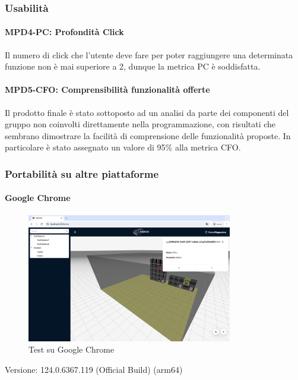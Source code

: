 \subsubsection{Usabilità}

\paragraph{MPD4-PC: Profondità Click}
Il numero di click che l'utente deve fare per poter raggiungere una determinata funzione non è mai superiore a 2, dunque la metrica PC è soddisfatta.

\paragraph{MPD5-CFO: Comprensibilità funzionalità offerte}
Il prodotto finale è stato sottoposto ad un analisi da parte dei componenti del gruppo non coinvolti direttamente nella programmazione, con risultati che sembrano dimostrare la facilità di comprensione delle funzionalità proposte. In particolare è stato assegnato un valore di 95\% alla metrica CFO.


\newpage
\subsubsection{Portabilità su altre piattaforme}
\paragraph{Google Chrome}
\begin{figure}[h!] 
    \centering
    \includegraphics[width=0.8\textwidth]{images/chrome.png}
    \caption{Test su Google Chrome}
\end{figure}
Versione: 124.0.6367.119 (Official Build) (arm64)

